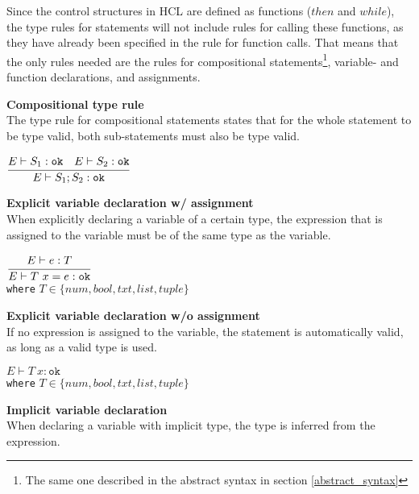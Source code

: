 Since the control structures in HCL are defined as functions ($then$ and $while$), the type rules for statements will not include rules for calling these functions, as they have already been specified in the rule for function calls.
That means that the only rules needed are the rules for compositional statements\footnote{The same one described in the abstract syntax in section \ref{abstract_syntax}}, variable- and function declarations, and assignments.

\textbf{Compositional type rule}\\
The type rule for compositional statements states that for the whole statement to be type valid, both sub-statements must also be type valid.

\begin{center}
	\begin{math}
	\cfrac
	{E \vdash S_1 : \texttt{ok}\quad E \vdash S_2 : \texttt{ok}}
	{E \vdash S_1;S_2 : \texttt{ok}}
	\end{math}
\end{center}


\textbf{Explicit variable declaration w/ assignment}\\
When explicitly declaring a variable of a certain type, the expression that is assigned to the variable must be of the same type as the variable.

\begin{center}
	\begin{math}
		\cfrac
		{E \vdash e : T}
		{E \vdash T\ x = e : \texttt{ok}}
	\end{math}
	\\[1\baselineskip]
	\texttt{where} $T \in \{num, bool, txt, list, tuple\}$
\end{center}

\textbf{Explicit variable declaration w/o assignment}\\
If no expression is assigned to the variable, the statement is automatically valid, as long as a valid type is used.

\begin{center}
	\begin{math}
		E \vdash T\ x : \texttt{ok}
	\end{math}
	\\[1\baselineskip]
	\texttt{where} $T \in \{num, bool, txt, list, tuple\}$
\end{center}

\textbf{Implicit variable declaration}\\
When declaring a variable with implicit type, the type is inferred from the expression.

